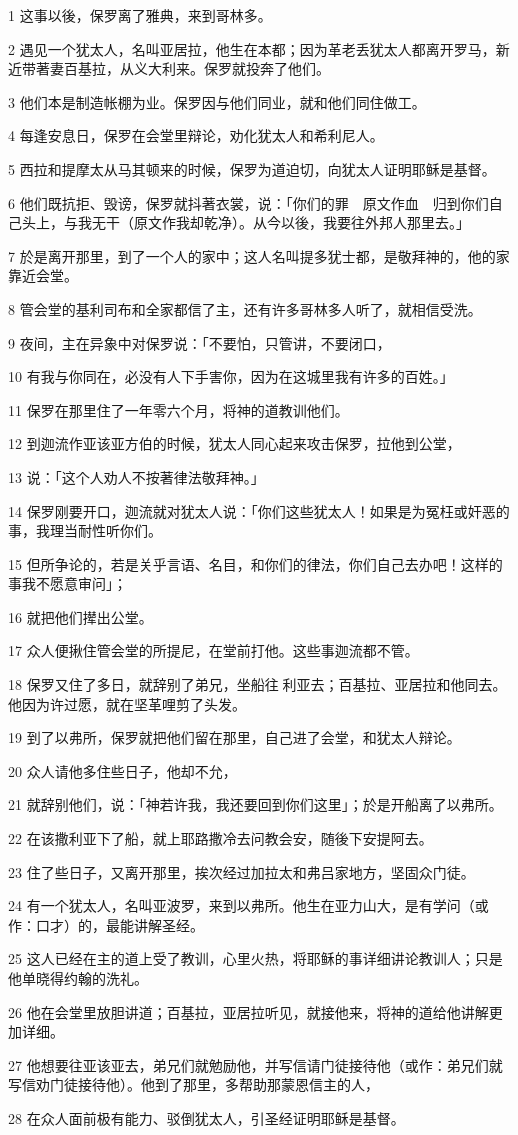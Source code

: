 \par 1 这事以後，保罗离了雅典，来到哥林多。
\par 2 遇见一个犹太人，名叫亚居拉，他生在本都；因为革老丢犹太人都离开罗马，新近带著妻百基拉，从义大利来。保罗就投奔了他们。
\par 3 他们本是制造帐棚为业。保罗因与他们同业，就和他们同住做工。
\par 4 每逢安息日，保罗在会堂里辩论，劝化犹太人和希利尼人。
\par 5 西拉和提摩太从马其顿来的时候，保罗为道迫切，向犹太人证明耶稣是基督。
\par 6 他们既抗拒、毁谤，保罗就抖著衣裳，说：「你们的罪　原文作血　归到你们自己头上，与我无干（原文作我却乾净）。从今以後，我要往外邦人那里去。」
\par 7 於是离开那里，到了一个人的家中；这人名叫提多犹士都，是敬拜神的，他的家靠近会堂。
\par 8 管会堂的基利司布和全家都信了主，还有许多哥林多人听了，就相信受洗。
\par 9 夜间，主在异象中对保罗说：「不要怕，只管讲，不要闭口，
\par 10 有我与你同在，必没有人下手害你，因为在这城里我有许多的百姓。」
\par 11 保罗在那里住了一年零六个月，将神的道教训他们。
\par 12 到迦流作亚该亚方伯的时候，犹太人同心起来攻击保罗，拉他到公堂，
\par 13 说：「这个人劝人不按著律法敬拜神。」
\par 14 保罗刚要开口，迦流就对犹太人说：「你们这些犹太人！如果是为冤枉或奸恶的事，我理当耐性听你们。
\par 15 但所争论的，若是关乎言语、名目，和你们的律法，你们自己去办吧！这样的事我不愿意审问」；
\par 16 就把他们撵出公堂。
\par 17 众人便揪住管会堂的所提尼，在堂前打他。这些事迦流都不管。
\par 18 保罗又住了多日，就辞别了弟兄，坐船往利亚去；百基拉、亚居拉和他同去。他因为许过愿，就在坚革哩剪了头发。
\par 19 到了以弗所，保罗就把他们留在那里，自己进了会堂，和犹太人辩论。
\par 20 众人请他多住些日子，他却不允，
\par 21 就辞别他们，说：「神若许我，我还要回到你们这里」；於是开船离了以弗所。
\par 22 在该撒利亚下了船，就上耶路撒冷去问教会安，随後下安提阿去。
\par 23 住了些日子，又离开那里，挨次经过加拉太和弗吕家地方，坚固众门徒。
\par 24 有一个犹太人，名叫亚波罗，来到以弗所。他生在亚力山大，是有学问（或作：口才）的，最能讲解圣经。
\par 25 这人已经在主的道上受了教训，心里火热，将耶稣的事详细讲论教训人；只是他单晓得约翰的洗礼。
\par 26 他在会堂里放胆讲道；百基拉，亚居拉听见，就接他来，将神的道给他讲解更加详细。
\par 27 他想要往亚该亚去，弟兄们就勉励他，并写信请门徒接待他（或作：弟兄们就写信劝门徒接待他）。他到了那里，多帮助那蒙恩信主的人，
\par 28 在众人面前极有能力、驳倒犹太人，引圣经证明耶稣是基督。

